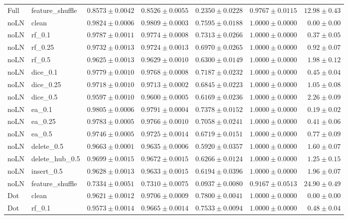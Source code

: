 \documentclass[UTF8,a4paper,11pt,fontset=fandol]{ctexart}
\begin{document}
{\begin{longtable}{llrrrrr}
Full & feature\_shuffle & $0.8573\pm0.0042$ & $0.8526\pm0.0055$ & $0.2350\pm0.0228$ & $0.9767\pm0.0115$ & $12.98\pm0.43$ \\
noLN & clean & $0.9824\pm0.0006$ & $0.9809\pm0.0003$ & $0.7595\pm0.0188$ & $1.0000\pm0.0000$ & $0.00\pm0.00$ \\
noLN & rf\_0.1 & $0.9787\pm0.0011$ & $0.9774\pm0.0008$ & $0.7313\pm0.0266$ & $1.0000\pm0.0000$ & $0.37\pm0.05$ \\
noLN & rf\_0.25 & $0.9732\pm0.0013$ & $0.9724\pm0.0013$ & $0.6970\pm0.0265$ & $1.0000\pm0.0000$ & $0.92\pm0.07$ \\
noLN & rf\_0.5 & $0.9625\pm0.0013$ & $0.9629\pm0.0010$ & $0.6300\pm0.0149$ & $1.0000\pm0.0000$ & $1.98\pm0.12$ \\
noLN & dice\_0.1 & $0.9779\pm0.0010$ & $0.9768\pm0.0008$ & $0.7187\pm0.0232$ & $1.0000\pm0.0000$ & $0.45\pm0.04$ \\
noLN & dice\_0.25 & $0.9718\pm0.0010$ & $0.9713\pm0.0002$ & $0.6845\pm0.0223$ & $1.0000\pm0.0000$ & $1.05\pm0.08$ \\
noLN & dice\_0.5 & $0.9597\pm0.0010$ & $0.9600\pm0.0005$ & $0.6169\pm0.0236$ & $1.0000\pm0.0000$ & $2.26\pm0.09$ \\
noLN & ea\_0.1 & $0.9805\pm0.0006$ & $0.9791\pm0.0004$ & $0.7378\pm0.0152$ & $1.0000\pm0.0000$ & $0.19\pm0.02$ \\
noLN & ea\_0.25 & $0.9783\pm0.0005$ & $0.9766\pm0.0010$ & $0.7058\pm0.0241$ & $1.0000\pm0.0000$ & $0.41\pm0.06$ \\
noLN & ea\_0.5 & $0.9746\pm0.0005$ & $0.9725\pm0.0014$ & $0.6719\pm0.0151$ & $1.0000\pm0.0000$ & $0.77\pm0.09$ \\
noLN & delete\_0.5 & $0.9663\pm0.0001$ & $0.9635\pm0.0006$ & $0.5920\pm0.0357$ & $1.0000\pm0.0000$ & $1.60\pm0.07$ \\
noLN & delete\_hub\_0.5 & $0.9699\pm0.0015$ & $0.9672\pm0.0015$ & $0.6266\pm0.0124$ & $1.0000\pm0.0000$ & $1.25\pm0.15$ \\
noLN & insert\_0.5 & $0.9628\pm0.0013$ & $0.9633\pm0.0015$ & $0.6194\pm0.0396$ & $1.0000\pm0.0000$ & $1.96\pm0.07$ \\
noLN & feature\_shuffle & $0.7334\pm0.0051$ & $0.7310\pm0.0075$ & $0.0937\pm0.0080$ & $0.9167\pm0.0513$ & $24.90\pm0.49$ \\
Dot & clean & $0.9621\pm0.0012$ & $0.9706\pm0.0009$ & $0.7800\pm0.0041$ & $1.0000\pm0.0000$ & $0.00\pm0.00$ \\
Dot & rf\_0.1 & $0.9573\pm0.0014$ & $0.9665\pm0.0014$ & $0.7533\pm0.0094$ & $1.0000\pm0.0000$ & $0.48\pm0.04$ \\

\end{longtable}}
\end{document}
